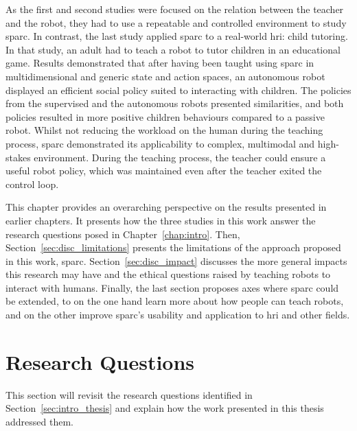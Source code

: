 As the first and second studies were focused on the relation between the teacher and the robot, they had to use a repeatable and controlled environment to study \gls{sparc}. In contrast, the last study applied \gls{sparc} to a real-world \gls{hri}: child tutoring. In that study, an adult had to teach a robot to tutor children in an educational game. Results demonstrated that after having been taught using \gls{sparc} in multidimensional and generic state and action spaces, an autonomous robot displayed an efficient social policy suited to interacting with children. The policies from the supervised and the autonomous robots presented similarities, and both policies resulted in more positive children behaviours compared to a passive robot. Whilst not reducing the workload on the human during the teaching process, \gls{sparc} demonstrated its applicability to complex, multimodal and high-stakes environment. During the teaching process, the teacher could ensure a useful robot policy, which was maintained even after the teacher exited the control loop.

This chapter provides an overarching perspective on the results presented in earlier chapters. It presents how the three studies in this work answer the research questions posed in Chapter~\ref{chap:intro}. Then, Section~\ref{sec:disc_limitations} presents the limitations of the approach proposed in this work, \gls{sparc}. Section~\ref{sec:disc_impact} discusses the more general impacts this research may have and the ethical questions raised by teaching robots to interact with humans.
Finally, the last section proposes axes where \gls{sparc} could be extended, to on the one hand learn more about how people can teach robots, and on the other improve \gls{sparc}'s usability and application to \gls{hri} and other fields.

\section{Research Questions} \label{sec:disc_rq}

This section will revisit the research questions identified in Section~\ref{sec:intro_thesis} and explain how the work presented in this thesis addressed them.

